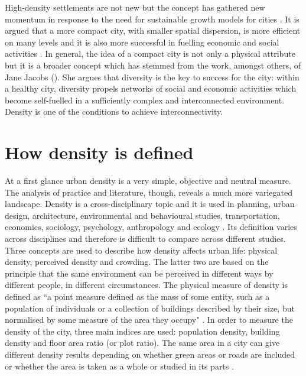 \documentclass [a4paper,12pt]{article} %
\begin{document}
High-density settlements are not new but the concept has gathered new momentum in response to the need for sustainable growth models for cities \citep{dantzig1973compact}. It is argued that a more compact city, with smaller spatial dispersion, is more efficient on many levels and it is also more successful in fuelling economic and social activities \citep{williams1996achieving}. 
In general, the idea of a compact city is not only a physical attribute but it is a broader concept which has stemmed from the work, amongst others, of Jane Jacobs (\citeyear{jacobs1961death}). She argues that diversity is the key to success for the city: within a healthy city, diversity propels networks of social and economic activities which become self-fuelled in a sufficiently complex and interconnected environment. Density is one of the conditions to achieve interconnectivity.


\section*{How density is defined}

At a first glance urban density is a very simple, objective and neutral measure. The analysis of practice and literature, though, reveals a much more variegated landscape. Density is a cross-disciplinary topic and it is used in planning, urban design, architecture, environmental and behavioural studies, transportation, economics, sociology, psychology, anthropology and ecology \citep{churchman1999disentangling}. Its definition varies across disciplines and therefore is difficult to compare across different studies. 
Three concepts are used to describe how density affects urban life: physical density, perceived density and crowding. The latter two are based on the principle that the same environment can be perceived in different ways by different people, in different circumstances. The physical measure of density is defined as ``a point measure defined as the mass of some entity, such as a population of individuals or a collection of buildings described by their size, but normalised by some measure of the area they occupy" \citep{Batty2009}. In order to measure the density of the city, three main indices are used: population density, building density and floor area ratio (or plot ratio). The same area in a city can give different density results depending on whether green areas or roads are included or whether the area is taken as a whole or studied in its parts \citep{campoli2007visualizing}. 
\end{document}
